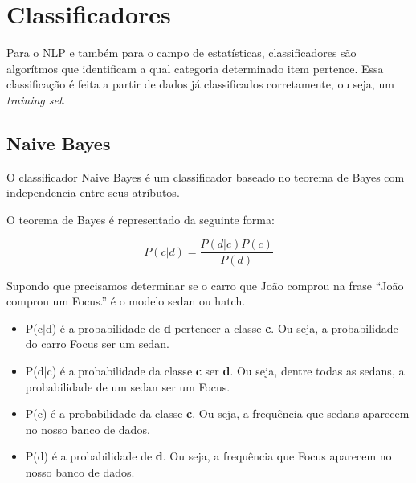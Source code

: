 % 
% 
% 

\section{Classificadores}
\label{cap:Classificadores}

Para o \ac{NLP} e também para o campo de estatísticas, classificadores são
algorítmos que identificam a qual categoria determinado item pertence. Essa
classificação é feita a partir de dados já classificados corretamente, ou seja,
um \textit{training set}.

\subsection{Naive Bayes}

O classificador Naive Bayes é um classificador baseado no teorema de Bayes com
independencia entre seus atributos.

O teorema de Bayes é representado da seguinte forma:

\[ P(c|d) = \frac{P(d|c) P(c)}{P(d)}  \]

Supondo que precisamos determinar se o carro que João comprou na frase ``João
comprou um Focus.'' é o modelo sedan ou hatch.
 
\begin{itemize}
  \item P(c$\vert$d) é a probabilidade de \textbf{d} pertencer a classe
  \textbf{c}. Ou seja, a probabilidade do carro Focus ser um sedan.
  \item P(d$\vert$c) é a probabilidade da classe \textbf{c} ser \textbf{d}. Ou
  seja, dentre todas as sedans, a probabilidade de um sedan ser
  um Focus.
  \item P(c) é a probabilidade da classe \textbf{c}. Ou seja, a frequência que
  sedans aparecem no nosso banco de dados.
  \item P(d) é a probabilidade de \textbf{d}. Ou seja, a frequência que Focus aparecem no nosso banco de dados.
\end{itemize}


